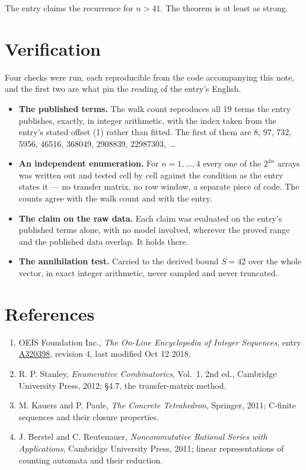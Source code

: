 \documentclass[11pt]{article}
\theoremstyle{definition}
\begin{document}
The entry claims the recurrence for $n > 41$. The theorem is at least as strong.

\section{Verification}

Four checks were run, each reproducible from the code accompanying this note, and the first two are what pin the reading of the entry's English.

\begin{itemize}

\item {\bfseries The published terms.} The walk count reproduces all 19 terms the entry publishes, exactly, in integer arithmetic, with the index taken from the entry's stated offset (1) rather than fitted. The first of them are 8, 97, 732, 5956, 46516, 368049, 2908839, 22987303,~\dots

\item {\bfseries An independent enumeration.} For $n = 1,\dots,4$ every one of the $2^{4n}$ arrays was written out and tested cell by cell against the condition as the entry states it --- no transfer matrix, no row window, a separate piece of code. The counts agree with the walk count and with the entry.

\item {\bfseries The claim on the raw data.} Each claim was evaluated on the entry's published terms alone, with no model involved, wherever the proved range and the published data overlap. It holds there.

\item {\bfseries The annihilation test.} Carried to the derived bound $S = 42$ over the whole vector, in exact integer arithmetic, never sampled and never truncated.

\end{itemize}

\section{References}

\begin{enumerate}

\item OEIS Foundation Inc., \emph{The On-Line Encyclopedia of Integer Sequences}, entry \href{https://oeis.org/A320398}{A320398}, revision 4, last modified Oct 12 2018.

\item R. P. Stanley, \emph{Enumerative Combinatorics}, Vol.~1, 2nd ed., Cambridge University Press, 2012; \S4.7, the transfer-matrix method.

\item M. Kauers and P. Paule, \emph{The Concrete Tetrahedron}, Springer, 2011; C-finite sequences and their closure properties.

\item J. Berstel and C. Reutenauer, \emph{Noncommutative Rational Series with Applications}, Cambridge University Press, 2011; linear representations of counting automata and their reduction.

\end{enumerate}
\end{document}
